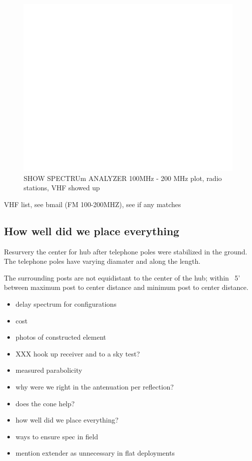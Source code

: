 \documentclass[preprint]{aastex}  %
\begin{document}
\begin{figure}[H]
	\begin{center}
	\includegraphics[width =\textwidth]{empty}
	\caption{SHOW SPECTRUm ANALYZER 100MHz - 200 MHz plot, radio stations, VHF showed up
\label{Fig:RFI} }
	\end{center}
\end{figure}

VHF list, see bmail (FM 100-200MHZ), see if any matches

\subsection{How well did we place everything}
Resurvery the center for hub after telephone poles were stabilized in the ground. The telephone poles have varying diamater and along the length. 

The surrounding posts are not equidistant to the center of the hub; within ~5' between maximum post to center distance and minimum post to center distance.

 

\begin{itemize}
\item delay spectrum for configurations
\item cost
\item photos of constructed element
\item XXX hook up receiver and to a sky test?
\item measured parabolicity
\item why were we right in the antenuation per reflection?
\item does the cone help?
\item how well did we place everything?
\item ways to ensure spec in field
\item mention extender as unnecessary in flat deployments
\end{itemize}
\end{document}
